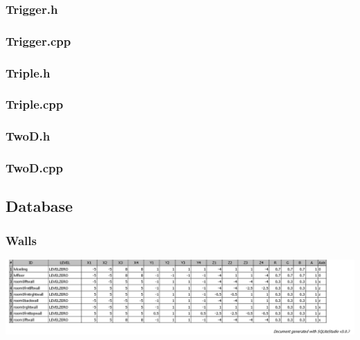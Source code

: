 \documentclass{article}
\begin{document}
	 				
\subsubsection{Trigger.h}
	
	 				
\subsubsection{Trigger.cpp}
	
	 				
\subsubsection{Triple.h}
	
	 				
\subsubsection{Triple.cpp}
	
	 				
\subsubsection{TwoD.h}
	

\subsubsection{TwoD.cpp}	
	

\subsection{Database}

\subsubsection{Walls}
	\includegraphics[width=18cm]{WALLS}
\end{document}
